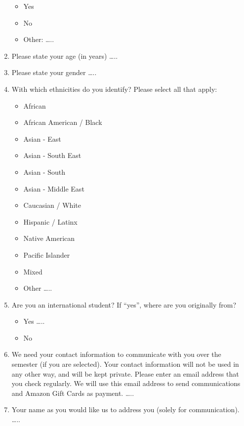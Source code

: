 \documentclass[letterpaper, nobind]{templates/ociamthesis}
\providecommand{\tightlist}{%
  \setlength{\itemsep}{0pt}\setlength{\parskip}{0pt}}
\begin{document}
\begin{enumerate}
  \begin{itemize}
  \tightlist
  \item
    Yes
  \item
    No
  \item
    Other: \ldots..
  \end{itemize}
\item
  Please state your age (in years) \ldots..
\item
  Please state your gender \ldots..
\item
  With which ethnicities do you identify? Please select all that apply:

  \begin{itemize}
  \tightlist
  \item
    African
  \item
    African American / Black
  \item
    Asian - East
  \item
    Asian - South East
  \item
    Asian - South
  \item
    Asian - Middle East
  \item
    Caucasian / White
  \item
    Hispanic / Latinx
  \item
    Native American
  \item
    Pacific Islander
  \item
    Mixed
  \item
    Other \ldots..
  \end{itemize}
\item
  Are you an international student? If ``yes'', where are you originally from?

  \begin{itemize}
  \tightlist
  \item
    Yes \ldots..
  \item
    No
  \end{itemize}
\item
  We need your contact information to communicate with you over the semester (if you are selected). Your contact information will not be used in any other way, and will be kept private. Please enter an email address that you check regularly. We will use this email address to send communications and Amazon Gift Cards as payment.
  \ldots..
\item
  Your name as you would like us to address you (solely for communication).
  \ldots..
\end{enumerate}
\end{document}
